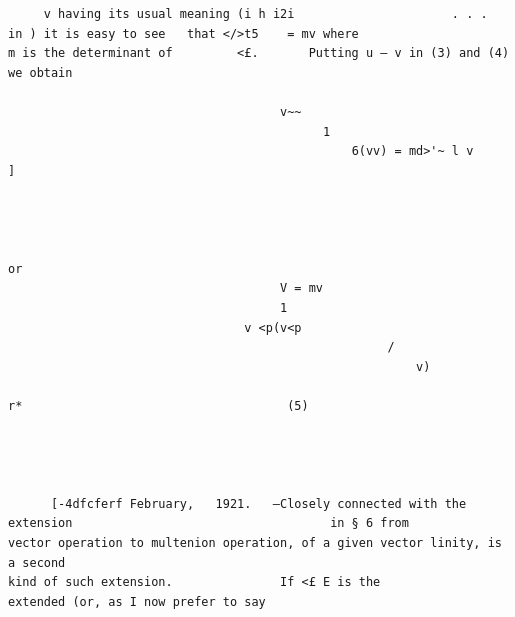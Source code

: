 \documentclass[10pt]{article}
\begin{document}
\begin{verbatim}
     v having its usual meaning (i h i2i                      . . .   in ) it is easy to see   that </>t5    = mv where
m is the determinant of         <£.       Putting u — v in (3) and (4) we obtain

                                      v~~
                                            1
                                                6(vv) = md>'~ l v               ]




or
                                      V = mv
                                      1
                                 v <p(v<p
                                                     /
                                                         v)
                                                                                r*                                     (5)




      [-4dfcferf February,   1921.   —Closely connected with the extension                                    in § 6 from
vector operation to multenion operation, of a given vector linity, is a second
kind of such extension.               If <£ E is the                    extended (or, as I now prefer to say


\end{verbatim}
\clearpage
\end{document}
